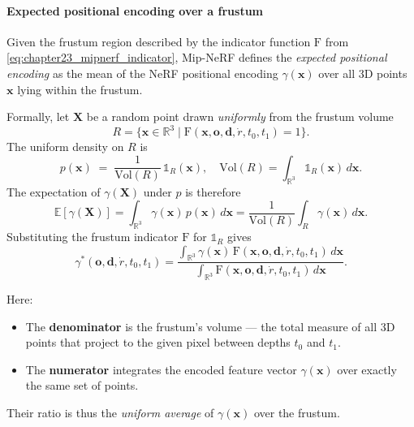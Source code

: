 \begin{enrichment}
\begin{enrichment}
    \paragraph{Expected positional encoding over a frustum}  
    Given the frustum region described by the indicator function $\mathrm{F}$ from \eqref{eq:chapter23_mipnerf_indicator}, Mip-NeRF defines the \emph{expected positional encoding} as the mean of the NeRF positional encoding $\gamma(\mathbf{x})$ over all 3D points $\mathbf{x}$ lying within the frustum.  
    
    Formally, let $\mathbf{X}$ be a random point drawn \emph{uniformly} from the frustum volume  
    \[
    R = \{ \mathbf{x} \in \mathbb{R}^3 \mid \mathrm{F}(\mathbf{x}, \mathbf{o}, \mathbf{d}, \dot{r}, t_0, t_1) = 1 \}.
    \]  
    The uniform density on $R$ is  
    \[
    p(\mathbf{x}) \;=\; \frac{1}{\mathrm{Vol}(R)} \, \mathbb{1}_R(\mathbf{x}),
    \quad
    \mathrm{Vol}(R) = \int_{\mathbb{R}^3} \mathbb{1}_R(\mathbf{x}) \, d\mathbf{x}.
    \]  
    The expectation of $\gamma(\mathbf{X})$ under $p$ is therefore  
    \[
    \mathbb{E}[\gamma(\mathbf{X})]
    = \int_{\mathbb{R}^3} \gamma(\mathbf{x})\, p(\mathbf{x})\, d\mathbf{x}
    = \frac{1}{\mathrm{Vol}(R)} \int_{R} \gamma(\mathbf{x}) \, d\mathbf{x}.
    \]  
    Substituting the frustum indicator $\mathrm{F}$ for $\mathbb{1}_R$ gives  
    \begin{equation}
        \gamma^*(\mathbf{o}, \mathbf{d}, \dot{r}, t_0, t_1)
        = \frac{
            \int_{\mathbb{R}^3} \gamma(\mathbf{x}) \,
            \mathrm{F}(\mathbf{x}, \mathbf{o}, \mathbf{d}, \dot{r}, t_0, t_1) \, d\mathbf{x}
        }{
            \int_{\mathbb{R}^3} \mathrm{F}(\mathbf{x}, \mathbf{o}, \mathbf{d}, \dot{r}, t_0, t_1) \, d\mathbf{x}
        }.
        \label{eq:chapter23_mipnerf_expected_encoding}
    \end{equation}
    
    \noindent
    Here:
    \begin{itemize}
        \item The \textbf{denominator} is the frustum’s volume — the total measure of all 3D points that project to the given pixel between depths $t_0$ and $t_1$.
        \item The \textbf{numerator} integrates the encoded feature vector $\gamma(\mathbf{x})$ over exactly the same set of points.
    \end{itemize}
    Their ratio is thus the \emph{uniform average} of $\gamma(\mathbf{x})$ over the frustum.
    

\end{enrichment}
\end{enrichment}
